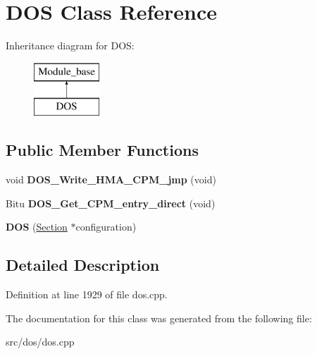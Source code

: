 \hypertarget{classDOS}{\section{D\-O\-S Class Reference}
\label{classDOS}
}
Inheritance diagram for D\-O\-S\-:\begin{figure}[H]
\begin{center}
\leavevmode
\includegraphics[height=2.000000cm]{classDOS}
\end{center}
\end{figure}
\subsection*{Public Member Functions}
\begin{DoxyCompactItemize}
\item 
\hypertarget{classDOS_a298dcab5e49ceecb15a2c1d9c4871866}{void {\bfseries D\-O\-S\-\_\-\-Write\-\_\-\-H\-M\-A\-\_\-\-C\-P\-M\-\_\-jmp} (void)}\label{classDOS_a298dcab5e49ceecb15a2c1d9c4871866}

\item 
\hypertarget{classDOS_a1fd7a02e49365782f597f1e4e0d67779}{Bitu {\bfseries D\-O\-S\-\_\-\-Get\-\_\-\-C\-P\-M\-\_\-entry\-\_\-direct} (void)}\label{classDOS_a1fd7a02e49365782f597f1e4e0d67779}

\item 
\hypertarget{classDOS_ad9dde79e7c7a3940e8aec707edc6e4ac}{{\bfseries D\-O\-S} (\hyperlink{classSection}{Section} $\ast$configuration)}\label{classDOS_ad9dde79e7c7a3940e8aec707edc6e4ac}

\end{DoxyCompactItemize}


\subsection{Detailed Description}


Definition at line 1929 of file dos.\-cpp.



The documentation for this class was generated from the following file\-:\begin{DoxyCompactItemize}
\item 
src/dos/dos.\-cpp\end{DoxyCompactItemize}
